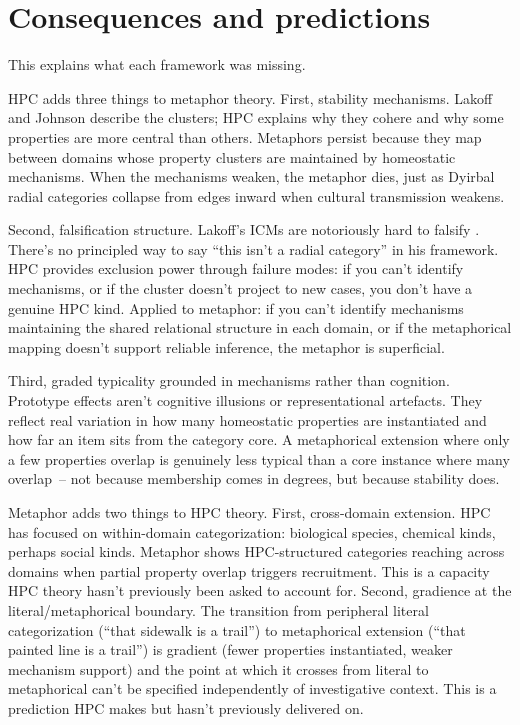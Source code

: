 \documentclass[12pt]{article}
\begin{document}
\section{Consequences and predictions}
\label{sec:consequences}

This explains what each framework was missing.

HPC adds three things to metaphor theory. First, stability mechanisms. Lakoff and Johnson describe the clusters; HPC explains why they cohere and why some properties are more central than others. Metaphors persist because they map between domains whose property clusters are maintained by homeostatic mechanisms. When the mechanisms weaken, the metaphor dies, just as Dyirbal radial categories collapse from edges inward when cultural transmission weakens.

Second, falsification structure. Lakoff's ICMs are notoriously hard to falsify \citep{glynn2010}. There's no principled way to say \enquote{this isn't a radial category} in his framework. HPC provides exclusion power through failure modes: if you can't identify mechanisms, or if the cluster doesn't project to new cases, you don't have a genuine HPC kind. Applied to metaphor: if you can't identify mechanisms maintaining the shared relational structure in each domain, or if the metaphorical mapping doesn't support reliable inference, the metaphor is superficial.

Third, graded typicality grounded in mechanisms rather than cognition. Prototype effects aren't cognitive illusions or representational artefacts. They reflect real variation in how many homeostatic properties are instantiated and how far an item sits from the category core. A metaphorical extension where only a few properties overlap is genuinely less typical than a core instance where many overlap~-- not because membership comes in degrees, but because stability does.

Metaphor adds two things to HPC theory. First, cross-domain extension. HPC has focused on within-domain categorization: biological species, chemical kinds, perhaps social kinds. Metaphor shows HPC-structured categories reaching across domains when partial property overlap triggers recruitment. This is a capacity HPC theory hasn't previously been asked to account for. Second, gradience at the literal/metaphorical boundary. The transition from peripheral literal categorization (\enquote{that sidewalk is a trail}) to metaphorical extension (\enquote{that painted line is a trail}) is gradient (fewer properties instantiated, weaker mechanism support) and the point at which it crosses from literal to metaphorical can't be specified independently of investigative context. This is a prediction HPC makes but hasn't previously delivered on.
\end{document}
